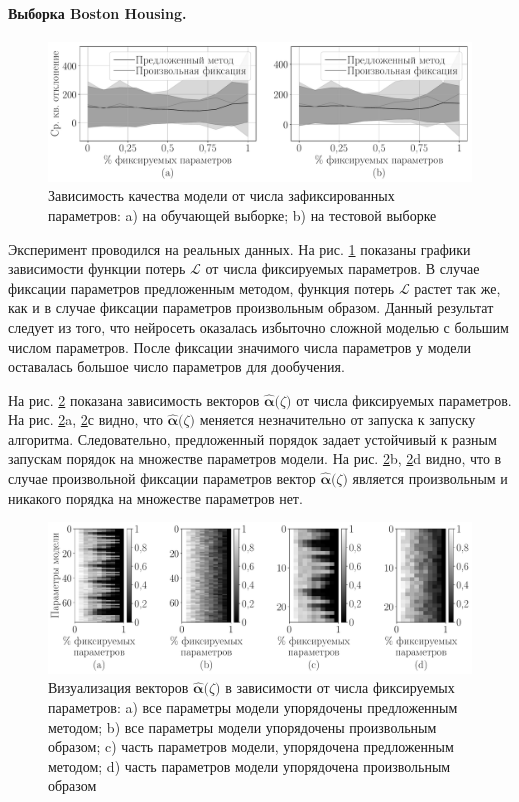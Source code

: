 \paragraph{Выборка Boston Housing.}
\begin{figure}[h!t]\center
\includegraphics[width=1\textwidth]{results/order/boston_data_loss}
\caption{Зависимость качества модели от числа зафиксированных параметров: a) на обучающей выборке; b) на тестовой выборке}
\label{ch-5:fg:ex:bost:1}
\end{figure}
Эксперимент проводился на реальных данных.
На рис. \ref{ch-5:fg:ex:bost:1} показаны графики зависимости функции потерь $\mathcal{L}$ от числа фиксируемых параметров. В случае фиксации параметров предложенным методом, функция потерь $\mathcal{L}$ растет так же, как и в случае фиксации параметров произвольным образом.
Данный результат следует из того, что нейросеть оказалась избыточно сложной моделью с большим числом параметров. После фиксации значимого числа параметров у модели оставалась большое число параметров для дообучения.

На рис. \ref{ch-5:fg:ex:bost:2} показана зависимость векторов $\hat{\bm{\alpha}}\bigr(\zeta\bigr)$ от числа фиксируемых параметров. На рис. \ref{ch-5:fg:ex:bost:2}a, \ref{ch-5:fg:ex:bost:2}с видно, что $\hat{\bm{\alpha}}\bigr(\zeta\bigr)$ меняется незначительно от запуска к запуску алгоритма. Следовательно, предложенный порядок задает устойчивый к разным запускам порядок на множестве параметров модели. На рис. \ref{ch-5:fg:ex:bost:2}b, \ref{ch-5:fg:ex:bost:2}d видно, что в случае произвольной фиксации параметров вектор $\hat{\bm{\alpha}}\bigr(\zeta\bigr)$ является произвольным и никакого порядка на множестве параметров нет.

\begin{figure}[h!t]\center
\includegraphics[width=1\textwidth]{results/order/boston_data_matshow}
\caption{Визуализация векторов $\hat{\bm{\alpha}}\bigr(\zeta\bigr)$ в зависимости от числа фиксируемых параметров: a) все параметры модели упорядочены предложенным методом; b) все параметры модели упорядочены произвольным образом; c) часть параметров модели, упорядочена предложенным методом; d) часть параметров модели упорядочена произвольным образом}
\label{ch-5:fg:ex:bost:2}
\end{figure}

